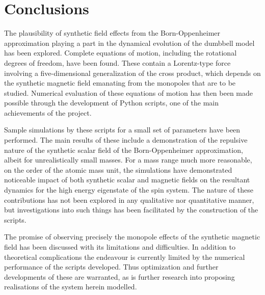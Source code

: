 \documentclass[main.tex]{subfiles}
\begin{document}
\section{Conclusions}
The plausibility of synthetic field effects from the Born-Oppenheimer approximation
playing a part in the dynamical evolution of the dumbbell model has been explored. Complete
equations of motion, including the rotational degrees of freedom, have been found. These
contain a Lorentz-type force involving a five-dimensional generalization of the cross
product, which depends on the synthetic magnetic field emanating from the monopoles that
are to be studied. Numerical evaluation of these equations of motion has then been made
possible through the development of Python scripts, one of the main achievements of the
project.

Sample simulations by these scripts for a small set of parameters have been performed. The
main results of these include a demonstration of the repulsive nature of the synthetic
scalar field of the Born-Oppenheimer approximation, albeit for unrealistically small
masses. For a mass range much more reasonable, on the order of the atomic mass unit, the
simulations have demonstrated noticeable impact of both synthetic scalar and magnetic
fields on the resultant dynamics for the high energy eigenstate of the spin system. The nature of these contributions has not been explored
in any qualitative nor quantitative manner, but investigations into such things has been facilitated by the construction of
the scripts.

The promise of observing precisely the monopole effects of the synthetic magnetic field
has been discussed with its limitations and difficulties. In addition to theoretical
complications the endeavour is currently limited by the numerical performance of the
scripts developed. Thus optimization and further developments of these are warranted, as
is further research into proposing realisations of the system herein modelled. 
\end{document}
